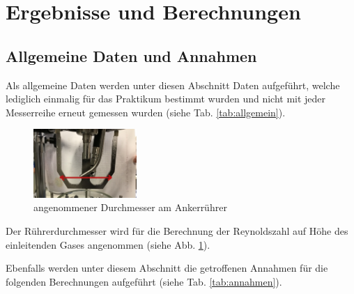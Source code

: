 \section{Ergebnisse und Berechnungen}
\label{sec:ergebnisse}

\subsection{Allgemeine Daten und Annahmen}
Als allgemeine Daten werden unter diesen Abschnitt Daten aufgeführt, welche lediglich einmalig für das Praktikum bestimmt wurden und nicht mit jeder Messerreihe erneut gemessen wurden (siehe Tab. \ref{tab:allgemein}).

\begin{table}[h!]
	\renewcommand*{\arraystretch}{1.2}
	\centering
	\caption{Allgemeine Daten}
	\label{tab:allgemein}
\end{table}%
\FloatBarrier

\begin{figure}[h!]
	\centering
	\includegraphics[width=0.35\textwidth]{img/anker}
	\caption{angenommener Durchmesser am Ankerrührer}
	\label{fig:anker}
\end{figure}
\FloatBarrier
Der Rührerdurchmesser wird für die Berechnung der Reynoldszahl auf Höhe des einleitenden Gases angenommen (siehe Abb. \ref{fig:anker}).

Ebenfalls werden unter diesem Abschnitt die getroffenen Annahmen für die folgenden Berechnungen aufgeführt (siehe Tab. \ref{tab:annahmen}).

